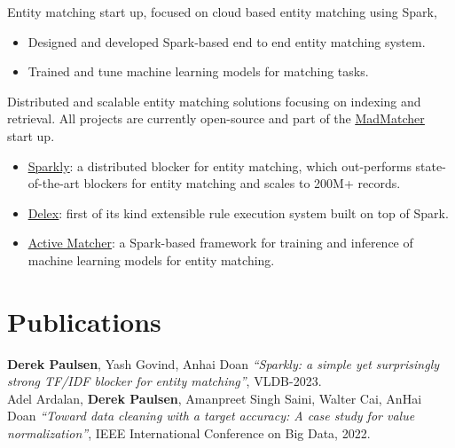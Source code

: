 \documentclass{resume}
\begin{document}

Entity matching start up, focused on cloud based entity matching using Spark,

\begin{itemize}
	\item Designed and developed Spark-based end to end entity matching system.
	\item Trained and tune machine learning models for matching tasks.
\end{itemize}


Distributed and scalable entity matching solutions focusing 
on indexing and retrieval. All projects are currently open-source and part of the \href{https://madmatcher.ai/}{\underline{MadMatcher}}
start up. 

\begin{itemize}
	\item \href{https://github.com/anhaidgroup/sparkly}{\underline{Sparkly}}: a distributed blocker for entity matching, which out-performs state-of-the-art blockers for entity matching and scales to 200M+ records. 
	\item \href{https://github.com/anhaidgroup/delex}{\underline{Delex}}: first of its kind extensible rule execution system built on top of Spark.
	\item \href{https://github.com/anhaidgroup/active\_matcher}{\underline{Active Matcher}}: a Spark-based framework for training and inference of machine learning models for entity matching.
\end{itemize}


\section{\textbf{Publications}}

\textbf{Derek Paulsen}, Yash Govind, Anhai Doan
\textit{``Sparkly: a simple yet surprisingly strong TF/IDF blocker for entity matching''}, VLDB-2023.\\

Adel Ardalan, \textbf{Derek Paulsen}, Amanpreet Singh Saini, Walter Cai, AnHai Doan
\textit{``Toward data cleaning with a target accuracy: A case study for value normalization''},
IEEE International Conference on Big Data, 2022.\\
\end{document}
